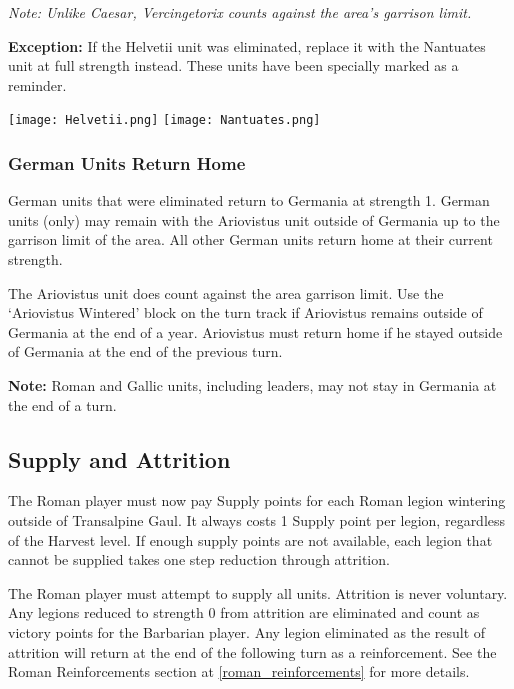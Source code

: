 \textit{Note: Unlike Caesar, Vercingetorix counts against the area's garrison limit.}

\textbf{Exception:} If the Helvetii unit was eliminated, replace it with the Nantuates unit at full strength instead. These units have been specially marked as a reminder.

\begin{center}
  \texttt{[image: Helvetii.png]}
    \hspace{1mm}
    \raisebox{6.5\height}{\Large$\rightarrow$}
    \hspace{1mm}
  \texttt{[image: Nantuates.png]}
\end{center}

\subsubsection{German Units Return Home}
\label{german_units_return_home}
\par
German units that were eliminated return to Germania at strength 1. German units (only) may remain with the Ariovistus unit outside of Germania up to the garrison limit of the area. All other German units return home at their current strength.

The Ariovistus unit does count against the area garrison limit. Use the ‘Ariovistus Wintered’ block on the turn track if Ariovistus remains outside of Germania at the end of a year. Ariovistus must return home if he stayed outside of Germania at the end of the previous turn.

\textbf{Note:} Roman and Gallic units, including leaders, may not stay in Germania at the end of a turn.

\subsection{Supply and Attrition}
\label{supply_and_attrition}
\par
The Roman player must now pay Supply points for each Roman legion wintering outside of Transalpine Gaul. It always costs 1 Supply point per legion, regardless of the Harvest level. If enough supply points are not available, each legion that cannot be supplied takes one step reduction through attrition.

The Roman player must attempt to supply all units. Attrition is never voluntary. Any legions reduced to strength 0 from attrition are eliminated and count as victory points for the Barbarian player. Any legion eliminated as the result of attrition will return at the end of the following turn as a reinforcement. See the Roman Reinforcements section at \ref{roman_reinforcements} for more details.

